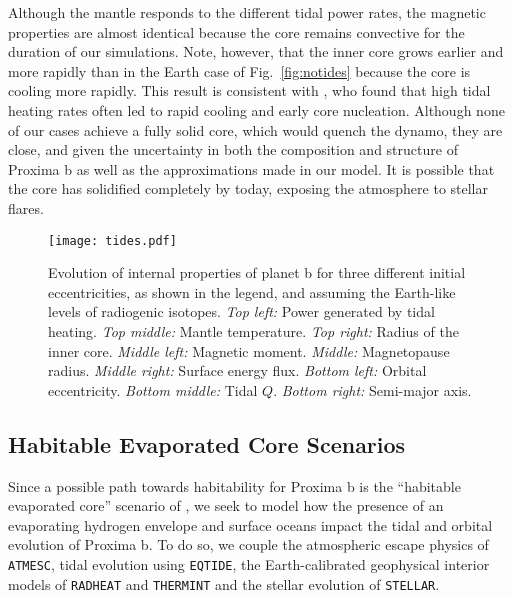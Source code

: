 \documentclass[preprint,12pt]{aastex}
\def\atmesc{\texttt{\footnotesize{ATMESC}}\xspace}
\def\eqtide{\texttt{\footnotesize{EQTIDE}}\xspace}
\def\radheat{\texttt{\footnotesize{RADHEAT}}\xspace}
\def\thermint{\texttt{\footnotesize{THERMINT}}\xspace}
\def\stellar{\texttt{\footnotesize{STELLAR}}\xspace}
\begin{document}
Although the mantle responds to the different tidal power rates, the
magnetic properties are almost identical because the core remains
convective for the duration of our simulations. Note, however, that
the inner core grows earlier and more rapidly than in the
Earth case of Fig.~\ref{fig:notides} because the core is cooling more
rapidly. This result is consistent with \cite{DriscollBarnes15}, who
found that high tidal heating rates often led to rapid cooling and
early core nucleation. Although none of our cases achieve a fully
solid core, which would quench the dynamo, they are close, and given
the uncertainty in both the composition and structure of Proxima b as
well as the approximations made in our model. It is possible that the
core has solidified completely by today, exposing the atmosphere to
stellar flares.

\begin{figure} 
\begin{center}
\texttt{[image: tides.pdf]}
\end{center}
\caption{Evolution of internal properties of planet b for three
  different initial eccentricities, as shown in the legend, and
  assuming the Earth-like levels of radiogenic isotopes. {\it Top
    left:} Power generated by tidal heating. {\it Top middle:} Mantle
  temperature. {\it Top right:} Radius of the inner core. {\it Middle
    left:} Magnetic moment. {\it Middle:} Magnetopause radius. {\it
    Middle right:} Surface energy flux. {\it Bottom left:} Orbital
  eccentricity. {\it Bottom middle:} Tidal $Q$. {\it Bottom right:}
  Semi-major axis.}
\label{fig:tides}
\end{figure}

\subsection{Habitable Evaporated Core Scenarios}

Since a possible path towards habitability for Proxima b is the
``habitable evaporated core'' scenario of \citet{Luger15}, we seek to
model how the presence of an evaporating hydrogen envelope and surface
oceans impact the tidal and orbital evolution of Proxima b.  To do so,
we couple the atmospheric escape physics of \atmesc, tidal evolution
using \eqtide, the Earth-calibrated geophysical interior models of
\radheat and \thermint and the stellar evolution of \stellar.
\end{document}
